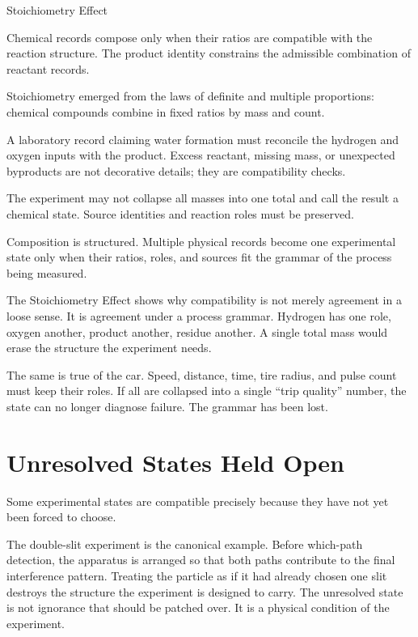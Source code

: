 \begin{phenom}{Stoichiometry Effect}
\label{ph:stoichiometry-effect}

\PhStatement Chemical records compose only when their ratios are compatible
with the reaction structure. The product identity constrains the admissible
combination of reactant records.

\PhOrigin Stoichiometry emerged from the laws of definite and multiple
proportions: chemical compounds combine in fixed ratios by mass and count.

\PhObservation A laboratory record claiming water formation must reconcile the
hydrogen and oxygen inputs with the product. Excess reactant, missing mass, or
unexpected byproducts are not decorative details; they are compatibility checks.

\PhConstraint The experiment may not collapse all masses into one total and
call the result a chemical state. Source identities and reaction roles must be
preserved.

\PhConsequence Composition is structured. Multiple physical records become one
experimental state only when their ratios, roles, and sources fit the grammar
of the process being measured.

\end{phenom}

The Stoichiometry Effect shows why compatibility is not merely agreement in a
loose sense. It is agreement under a process grammar. Hydrogen has one role,
oxygen another, product another, residue another. A single total mass would
erase the structure the experiment needs.

The same is true of the car. Speed, distance, time, tire radius, and pulse count
must keep their roles. If all are collapsed into a single ``trip quality''
number, the state can no longer diagnose failure. The grammar has been lost.

\section{Unresolved States Held Open}
\label{se:unresolved-states-held-open}

Some experimental states are compatible precisely because they have not yet
been forced to choose.

The double-slit experiment is the canonical example. Before which-path
detection, the apparatus is arranged so that both paths contribute to the final
interference pattern. Treating the particle as if it had already chosen one
slit destroys the structure the experiment is designed to carry. The unresolved
state is not ignorance that should be patched over. It is a physical condition
of the experiment.

